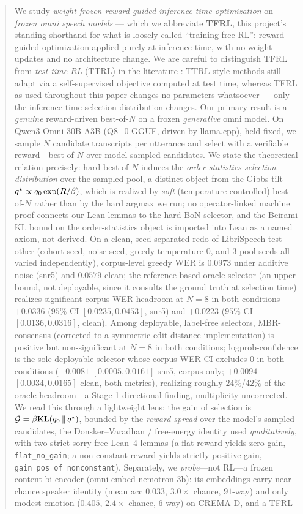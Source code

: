 \begin{abstract}
We study \emph{weight-frozen reward-guided inference-time optimization} on \emph{frozen omni speech models} --- which we abbreviate \textbf{TFRL}, this project's standing shorthand for what is loosely called ``training-free RL'': reward-guided optimization applied purely at inference time, with no weight updates and no architecture change. We are careful to distinguish TFRL from \emph{test-time RL} (TTRL) in the literature \citep{zuo2025ttrl}: TTRL-style methods still adapt via a self-supervised objective computed at test time, whereas TFRL as used throughout this paper changes no parameters whatsoever --- only the inference-time selection distribution changes. Our primary result is a \emph{genuine} reward-driven best-of-$N$ on a frozen \emph{generative} omni model. On Qwen3-Omni-30B-A3B (Q8\_0 GGUF, driven by llama.cpp), held fixed, we sample $N$ candidate transcripts per utterance and select with a verifiable reward---best-of-$N$ over model-sampled candidates. We state the theoretical relation precisely: hard best-of-$N$ induces the \emph{order-statistics selection distribution} over the sampled pool, a distinct object from the Gibbs tilt $\qs\propto\qo\exp(\Rwd/\beta)$, which is realized by \emph{soft} (temperature-controlled) best-of-$N$ rather than by the hard argmax we run; no operator-linked machine proof connects our Lean lemmas to the hard-BoN selector, and the Beirami KL bound on the order-statistics object is imported into Lean as a named axiom, not derived. On a clean, seed-separated redo of LibriSpeech test-other (cohort seed, noise seed, greedy temperature $0$, and $3$ pool seeds all varied independently), corpus-level greedy WER is $0.0973$ under additive noise (snr5) and $0.0579$ clean; the reference-based oracle selector (an upper bound, not deployable, since it consults the ground truth at selection time) realizes significant corpus-WER headroom at $N=8$ in both conditions---$+0.0336$ ($95\%$ CI $[0.0235,0.0453]$, snr5) and $+0.0223$ ($95\%$ CI $[0.0136,0.0316]$, clean). Among deployable, label-free selectors, MBR-consensus (corrected to a symmetric edit-distance implementation) is positive but non-significant at $N=8$ in both conditions; logprob-confidence is the sole deployable selector whose corpus-WER CI excludes $0$ in both conditions ($+0.0081$ $[0.0005,0.0161]$ snr5, corpus-only; $+0.0094$ $[0.0034,0.0165]$ clean, both metrics), realizing roughly $24\%$/$42\%$ of the oracle headroom---a Stage-1 directional finding, multiplicity-uncorrected. We read this through a lightweight lens: the gain of selection is $\gain=\beta\KL{\qo}{\qs}$, bounded by the \emph{reward spread} over the model's sampled candidates, the Donsker--Varadhan / free-energy identity used \emph{qualitatively}, with two strict sorry-free Lean~4 lemmas (a flat reward yields zero gain, \texttt{flat\_no\_gain}; a non-constant reward yields strictly positive gain, \texttt{gain\_pos\_of\_nonconstant}). Separately, we \emph{probe}---not RL---a frozen content bi-encoder (omni-embed-nemotron-3b): its embeddings carry near-chance speaker identity (mean acc $0.033$, $3.0\times$ chance, $91$-way) and only modest emotion ($0.405$, $2.4\times$ chance, $6$-way) on CREMA-D, and a TFRL 
\end{abstract}

